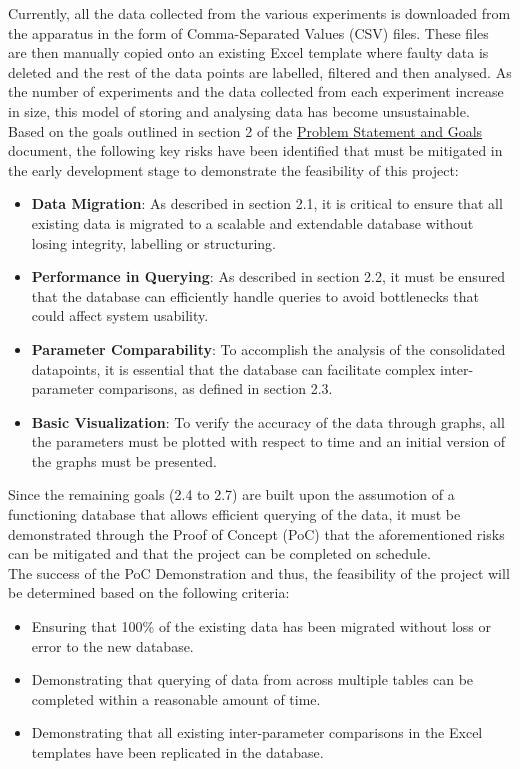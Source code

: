 \documentclass{article}
\begin{document}
Currently, all the data collected from the various experiments is downloaded from the 
apparatus in the form of Comma-Separated Values (CSV) files. These files are then manually
copied onto an existing Excel template where faulty data is deleted and the rest of the data points
are labelled, filtered and then analysed. As the number of experiments and the data collected
from each experiment increase in size, this model of storing and analysing data has
become unsustainable.\\
\newline
\noindent Based on the goals outlined in section 2 of the \href{https://github.com/SumanyaG/Alkalytics/blob/6efc4b2a5f37f2309be86f1e1bfc49c1ddfd097d/docs/ProblemStatementAndGoals/ProblemStatement.pdf}{Problem Statement and Goals} document,
the following key risks have been identified that must be mitigated in the early development
stage to demonstrate the feasibility of this project:
\begin{itemize}
  \item \textbf{Data Migration}: As described in section 2.1, it is critical to ensure that all existing 
  data is migrated to a scalable and extendable database without losing integrity, labelling or structuring.
  \item \textbf{Performance in Querying}: As described in section 2.2, it must be ensured that the database can 
  efficiently handle queries to avoid bottlenecks that could affect system usability.
  \item \textbf{Parameter Comparability}: To accomplish the analysis of the consolidated datapoints, it is essential
  that the database can facilitate complex inter-parameter comparisons, as defined in section 2.3.
  \item \textbf{Basic Visualization}: To verify the accuracy of the data through graphs, all the parameters must 
  be plotted with respect to time and an initial version of the graphs must be presented.
\end{itemize}

\noindent Since the remaining goals (2.4 to 2.7) are built upon the assumotion of a functioning database that 
allows efficient querying of the data, it must be demonstrated through the Proof of Concept (PoC) that the aforementioned
risks can be mitigated and that the project can be completed on schedule.\\
\newline
\noindent The success of the PoC Demonstration and thus, the feasibility of the project will be determined based 
on the following criteria:
\begin{itemize}
  \item Ensuring that 100\% of the existing data has been migrated without loss or error to the new database.
  \item Demonstrating that querying of data from across multiple tables can be completed within a reasonable amount of time.
  \item Demonstrating that all existing inter-parameter comparisons in the Excel templates have been replicated in the database.
\end{itemize}
\end{document}
